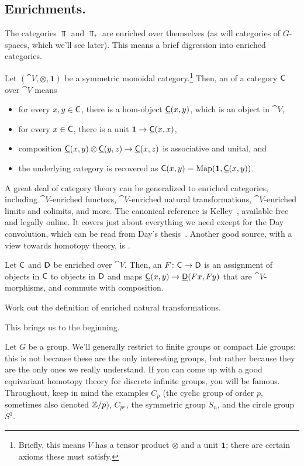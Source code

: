 \subsection*{Enrichments.}
The categories $\Top$ and $\Top_*$ are enriched over themselves (as will categories of $G$-spaces, which we'll see
later). This means a brief digression into enriched categories.
\begin{defn}
Let $(\cat V,\otimes, \boldsymbol 1)$ be a symmetric monoidal category.\footnote{Briefly, this means $V$ has a
tensor product $\otimes$ and a unit $\boldsymbol 1$; there are certain axioms these must satisfy.} Then, an
 of a category $\mathsf C$ over $\cat V$ means
\begin{itemize}
	\item for every $x,y\in\mathsf C$, there is a hom-object $\underline{\mathsf C}(x,y)$, which is an object in $\cat V$,
	\item for every $x\in\mathsf C$, there is a unit $\boldsymbol 1\to\underline{\mathsf C}(x,x)$,
	\item composition $\underline{\mathsf C}(x,y)\otimes\underline{\mathsf C}(y,z)\to\underline{\mathsf C}(x,z)$ is associative and unital,
	and
	\item the underlying category is recovered as $\mathsf C(x,y) = \operatorname{Map}(\boldsymbol 1, \underline{\mathsf C}(x,y))$.
\end{itemize}
\end{defn}
A great deal of category theory can be generalized to enriched categories, including $\cat V$-enriched functors,
$\cat V$-enriched natural transformations, $\cat V$-enriched limits and colimits, and more. The canonical reference
is Kelley~\cite{Kelley}, available free and legally online. It covers just about everything we need except for the
Day convolution, which can be read from Day's thesis~\cite{DayThesis}. Another good source, with a view towards homotopy theory, is \cite[Chapter 3]{RiehlCHT}.
\begin{defn}
Let $\mathsf C$ and $\mathsf D$ be enriched over $\cat V$. Then, an  $F\colon\mathsf C\to\mathsf D$ is an assignment
of objects in $\mathsf C$ to objects in $\mathsf D$ and maps $\underline{\mathsf C}(x,y)\to\underline{\mathsf D}(Fx, Fy)$ that are $\cat
V$-morphisms, and commute with composition.
\end{defn}
\begin{ex}
Work out the definition of enriched natural transformations.
\end{ex}
This brings us to the beginning.

\orbreak

Let $G$ be a group. We'll generally restrict to finite groups or compact Lie groups; this is not because these are
the only interesting groups, but rather because they are the only ones we really understand. If you can come up
with a good equivariant homotopy theory for discrete infinite groups, you will be famous. Throughout, keep in mind
the examples $C_p$ (the cyclic group of order $p$, sometimes also denoted $\mathbb Z/p$), $C_{p^n}$, the symmetric group
$S_n$, and the circle group $S^1$.

